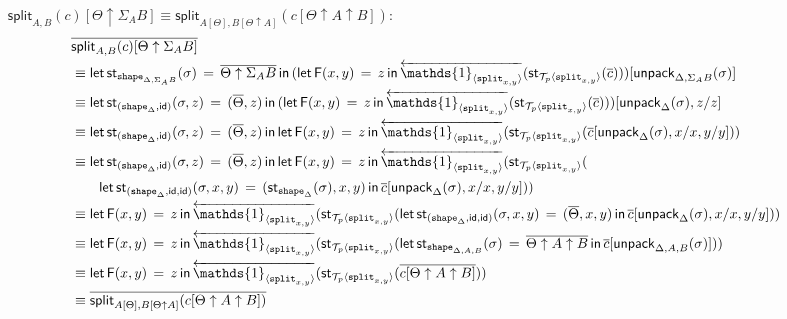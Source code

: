\documentclass[10pt]{article}
\theoremstyle{definition}
\newcommand{\id}{\mathsf{id}}
\newcommand{\rewrite}[2]{\overleftarrow{#1}(#2)}
\newcommand\StI[2]{\ensuremath{\mathsf{st}_{#1}(#2)}}
\newcommand\StE[4]{\ensuremath{\mathsf{let} \, \StI{#1}{#3} \, = \, {#2} \, \mathsf{in} \, #4}}
\newcommand\FE[3]{\ensuremath{\mathsf{let} \, \mathsf{F}(#2) \, = \, {#1} \, \mathsf{in} \, #3}}
\newcommand\ApEl[2]{\mathcal{T}_{#1}\langle#2\rangle}
\newcommand\unpack[2]{\ensuremath{\mathsf{unpack}_{#1}(#2)}}
\newcommand{\tshape}[1]{\ensuremath{\mathtt{shape}_{#1}}}
\newcommand{\upstairs}[1]{\overline{#1}}
\newcommand\One{\ensuremath{\mathds{1}}}
\newcommand\ApOne[1]{\ensuremath{\One_{\langle {#1} \rangle }}}
\newcommand\tsplit[1]{\ensuremath{\mathtt{split}_{#1}}}
\newcommand\qsplit[1]{\ensuremath{\mathsf{split}_{#1}}}
\begin{document}
\begin{enumerate}[style = multiline, labelwidth = 80pt]
\item[{$\qsplit{A,B}(c)[\Theta \uparrow \Sigma_A B] \equiv \qsplit{A[\Theta],B[\Theta \uparrow A]}(c[\Theta \uparrow A \uparrow B])$}:]
\begin{align*}
&\upstairs{\qsplit{A,B}(c)[\Theta \uparrow \Sigma_A B]} \\
&\equiv \StE{\tshape{\Delta, \Sigma_A B}}{\upstairs{\Theta \uparrow \Sigma_A B}}{\sigma}{(\FE{z}{x,y}{\rewrite{\ApOne{\tsplit{x,y}}}{\StI{\ApEl{p}{\tsplit{x,y}}}{\upstairs{c}}}})[\unpack{\Delta, \Sigma_A B}{\sigma}]} \\
&\equiv \StE{(\tshape{\Delta}, \id)}{(\upstairs{\Theta}, z)}{\sigma, z}{(\FE{z}{x,y}{\rewrite{\ApOne{\tsplit{x,y}}}{\StI{\ApEl{p}{\tsplit{x,y}}}{\upstairs{c}}}})[\unpack{\Delta}{\sigma}, z/z]} \\
&\equiv \StE{(\tshape{\Delta}, \id)}{(\upstairs{\Theta}, z)}{\sigma, z}{\FE{z}{x,y}{\rewrite{\ApOne{\tsplit{x,y}}}{\StI{\ApEl{p}{\tsplit{x,y}}}{\upstairs{c}[\unpack{\Delta}{\sigma}, x/x, y/y]}}}} \\
&\equiv \StE{(\tshape{\Delta}, \id)}{(\upstairs{\Theta}, z)}{\sigma, z}{\FE{z}{x,y}{\rewrite{\ApOne{\tsplit{x,y}}}{\StI{\ApEl{p}{\tsplit{x,y}}}{\\&\qquad \StE{(\tshape{\Delta}, \id, \id)}{(\StI{\tshape{\Delta}}{\sigma},x, y)}{\sigma,x,y}{\upstairs{c}[\unpack{\Delta}{\sigma}, x/x, y/y]}}}}} \\
&\equiv \FE{z}{x,y}{\rewrite{\ApOne{\tsplit{x,y}}}{\StI{\ApEl{p}{\tsplit{x,y}}}{\StE{(\tshape{\Delta}, \id, \id)}{(\upstairs{\Theta},x, y)}{\sigma,x,y}{\upstairs{c}[\unpack{\Delta}{\sigma}, x/x, y/y]}}}} \\
&\equiv \FE{z}{x,y}{\rewrite{\ApOne{\tsplit{x,y}}}{\StI{\ApEl{p}{\tsplit{x,y}}}{\StE{\tshape{\Delta, A, B}}{\upstairs{\Theta \uparrow A \uparrow B}}{\sigma}{\upstairs{c}[\unpack{\Delta, A, B}{\sigma}]}}}} \\
&\equiv \FE{z}{x,y}{\rewrite{\ApOne{\tsplit{x,y}}}{\StI{\ApEl{p}{\tsplit{x,y}}}{\upstairs{c[\Theta \uparrow A \uparrow B]}}}} \\
&\equiv \upstairs{\qsplit{A[\Theta],B[\Theta \uparrow A]}(c[\Theta \uparrow A \uparrow B])}
\end{align*}


\end{enumerate}
\end{document}
